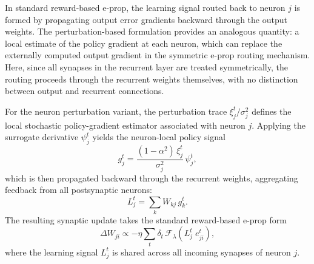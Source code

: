     In standard reward-based e-prop, the learning signal routed back to neuron
    $j$ is formed by propagating output error gradients backward through the
    output weights.
    The perturbation-based formulation provides an analogous quantity: a local
    estimate of the policy gradient at each neuron, which can replace the
    externally computed output gradient in the symmetric e-prop routing mechanism.
    Here, since all synapses in the recurrent layer are treated symmetrically,
    the routing proceeds through the recurrent weights themselves, with no
    distinction between output and recurrent connections.
    
    For the neuron perturbation variant, the perturbation trace
    $\xi_j^t / \sigma_j^2$ defines the local stochastic policy-gradient estimator
    associated with neuron $j$.
    Applying the surrogate derivative $\psi_j^t$ yields the neuron-local policy
    signal
    \[
        g_j^t
        =
        \frac{(1-\alpha^2)\,\xi_j^t}{\sigma_j^2}\,
        \psi_j^t,
    \]
    which is then propagated backward through the recurrent weights, aggregating
    feedback from all postsynaptic neurons:
    \[
        L_j^t
        =
        \sum_{k}
        W_{kj}\,
        g_k^t.
    \]
    The resulting synaptic update takes the standard reward-based e-prop form
    \[
        \Delta W_{ji}
        \propto
        -\eta
        \sum_t
        \delta_t\,
        \mathcal{F}_{\lambda}
        \!\left(
            L_j^t\;
            e_{ji}^t
        \right),
    \]
    where the learning signal $L_j^t$ is shared across all incoming synapses of
    neuron $j$.
    
